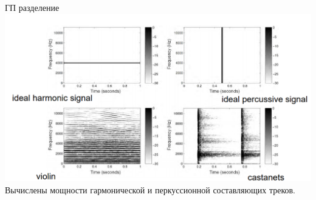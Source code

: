 \documentclass[c, aspectratio = 43]{beamer}
\begin{document}
\begin{frame}{ГП разделение}
\includegraphics[width=\linewidth]{hp.png}
\vfill
Вычислены мощности гармонической и перкуссионной составляющих треков.  
\end{frame}
\end{document}
